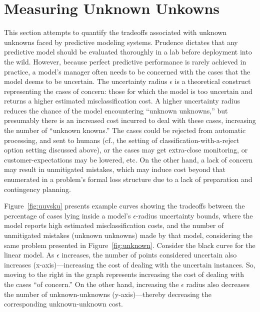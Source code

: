 \section{Measuring Unknown Unkowns}
\label{sec:measure}

This section attempts to quantify the tradeoffs associated with
unknown unknowns faced by predictive modeling systems.  Prudence dictates that any
predictive model should be evaluated thoroughly in a lab before
deployment into the wild. However, because perfect predictive
performance is rarely achieved in practice, a model's manager often
needs to be concerned with the cases that the model deems to be
uncertain.  The uncertainty radius $\epsilon$ is a theoretical
construct representing the cases of concern: those for which the model
is too uncertain and returns a higher estimated misclassification cost. 
A higher uncertainty radius reduces the chance of the model encountering ``unknown unknowns,'' but
 presumably there is an increased cost incurred to deal with these cases, increasing the number of ``unknown knowns.''
The cases could be rejected from automatic processing, and sent to
humans (cf., the setting of classification-with-a-reject option setting discussed above), or the
cases may get extra-close monitoring, or customer-expectations may be
lowered, etc.  On the other hand, a lack of concern may result in
unmitigated mistakes, which may induce cost beyond that enumerated in
a problem's formal loss structure due to a lack of preparation and contingency
planning.

Figure~\ref{fig:uuvsku} presents example curves showing the tradeoffs
between the percentage of cases lying inside a model's
$\epsilon$-radius uncertainty bounds, where the model reports high estimated misclassification costs, 
and the number of unmitigated
mistakes (unknown unknowns) made by that model, considering the same
problem presented in Figure~\ref{fig:unknown}.  Consider the black
curve for the linear model.  As $\epsilon$ increases, the number of
points considered uncertain also increases (x-axis)---increasing the
cost of dealing with the uncertain instances.  So, moving to the right
in the graph represents increasing the cost of dealing with the cases
``of concern.''  On the other hand, increasing the $\epsilon$ radius
also decreases the number of unknown-unknowns (y-axis)---thereby
decreasing the corresponding unknown-unknown cost.


